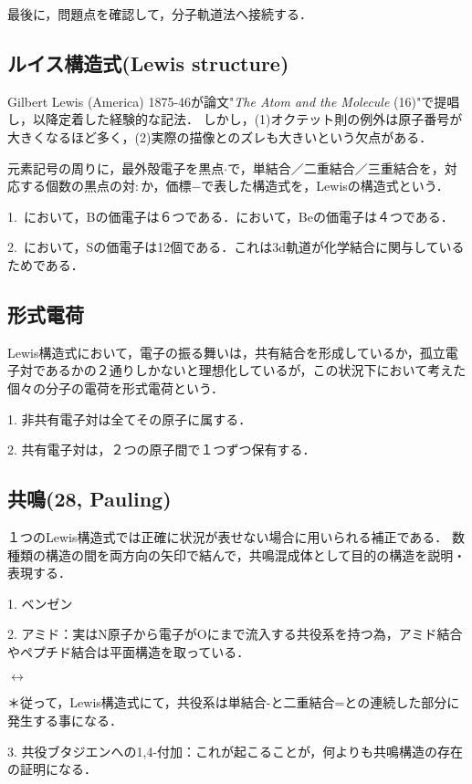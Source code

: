 \documentclass[uplatex, dvipdfmx]{jsreport}
\begin{document}
最後に，問題点を確認して，分子軌道法へ接続する．

\subsection{ルイス構造式(Lewis structure)}
Gilbert Lewis (America) 1875-46が論文"{\it The Atom and the Molecule} (16)"で提唱し，以降定着した経験的な記法．
しかし，(1)オクテット則の例外は原子番号が大きくなるほど多く，(2)実際の描像とのズレも大きいという欠点がある．

\begin{definition}
    元素記号の周りに，最外殻電子を黒点$\cdot$で，単結合／二重結合／三重結合を，対応する個数の黒点の対$:$か，価標$-$で表した構造式を，Lewisの構造式という．\rm{}
\end{definition}
\begin{example}[オクテット則の例外]\rm{}

    1.\, において，Bの価電子は６つである．において，Beの価電子は４つである．
    
    2.\, において，Sの価電子は12個である．これは3d軌道が化学結合に関与しているためである．
\end{example}

\subsection*{形式電荷}

\begin{definition}
    Lewis構造式において，電子の振る舞いは，共有結合を形成しているか，孤立電子対であるかの２通りしかないと理想化しているが，この状況下において考えた個々の分子の電荷を形式電荷という．

    1. 非共有電子対は全てその原子に属する．

    2. 共有電子対は，２つの原子間で１つずつ保有する．
\end{definition}

\subsection{共鳴(28, Pauling)}

１つのLewis構造式では正確に状況が表せない場合に用いられる補正である．
数種類の構造の間を両方向の矢印で結んで，共鳴混成体として目的の構造を説明・表現する．

\begin{example}
    1. ベンゼン

    2. アミド：実はN原子から電子がOにまで流入する共役系を持つ為，アミド結合やペプチド結合は平面構造を取っている．
    \begin{center}
         $\longleftrightarrow$ 
    \end{center}

    ＊従って，Lewis構造式にて，共役系は単結合-と二重結合=との連続した部分に発生する事になる．

    3. 共役ブタジエンへの1,4-付加：これが起こることが，何よりも共鳴構造の存在の証明になる．
\end{example}
\end{document}
